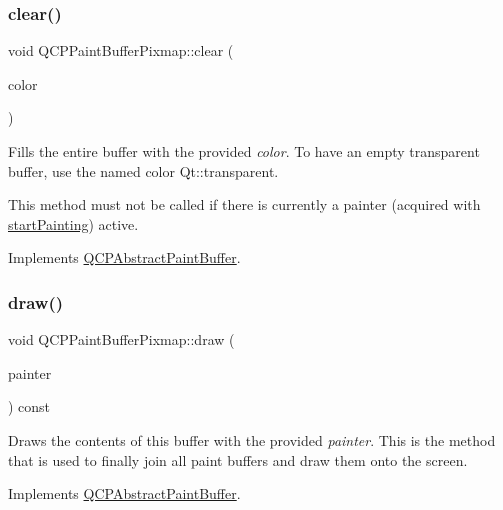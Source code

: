\subsubsection{\texorpdfstring{clear()}{clear()}}
{\footnotesize\ttfamily void Q\+C\+P\+Paint\+Buffer\+Pixmap\+::clear (\begin{DoxyParamCaption}\item[{const Q\+Color \&}]{color }\end{DoxyParamCaption})\hspace{0.3cm}{\ttfamily [virtual]}}

Fills the entire buffer with the provided {\itshape color}. To have an empty transparent buffer, use the named color {\ttfamily Qt\+::transparent}.

This method must not be called if there is currently a painter (acquired with \hyperlink{classQCPPaintBufferPixmap_a357964ef7d28cfa530338be4e5c93234}{start\+Painting}) active. 

Implements \hyperlink{classQCPAbstractPaintBuffer_a9e253f4541dfc01992b77e8830bd7722}{Q\+C\+P\+Abstract\+Paint\+Buffer}.

\mbox{\label{classQCPPaintBufferPixmap_af7bfc685e56a0a9329e57cd9a265eb74}} 
\subsubsection{\texorpdfstring{draw()}{draw()}}
{\footnotesize\ttfamily void Q\+C\+P\+Paint\+Buffer\+Pixmap\+::draw (\begin{DoxyParamCaption}\item[{\hyperlink{classQCPPainter}{Q\+C\+P\+Painter} $\ast$}]{painter }\end{DoxyParamCaption}) const\hspace{0.3cm}{\ttfamily [virtual]}}

Draws the contents of this buffer with the provided {\itshape painter}. This is the method that is used to finally join all paint buffers and draw them onto the screen. 

Implements \hyperlink{classQCPAbstractPaintBuffer_afb998c7525e3ae37d9d2d46c7aaf461a}{Q\+C\+P\+Abstract\+Paint\+Buffer}.

\mbox{\label{classQCPPaintBufferPixmap_ad49f3205ba3463b1c44f8db3cfcc90f0}} 
